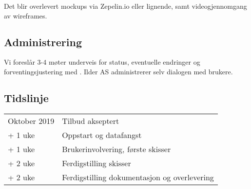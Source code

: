 Det blir overlevert  mockups via Zepelin.io eller lignende, samt videogjennomgang av wireframes.

\subsection{Administrering}
Vi foreslår 3-4 møter underveis for status, eventuelle endringer og forventingsjustering med \customername. Ilder AS administrerer selv dialogen med brukere.

\subsection{Tidslinje}

\begin{center}
\begin{tabu} to 0.95\textwidth {  X[l]  X[l]  }
 \hline
 Oktober 2019 & Tilbud akseptert \\ 
 + 1 uke & Oppstart og datafangst  \\
 + 1 uke & Brukerinvolvering, første skisser   \\
 + 2 uke & Ferdigstilling skisser \\
 + 2 uke & Ferdigstilling dokumentasjon og overlevering\\
 \hline
\end{tabu}
\end{center}





